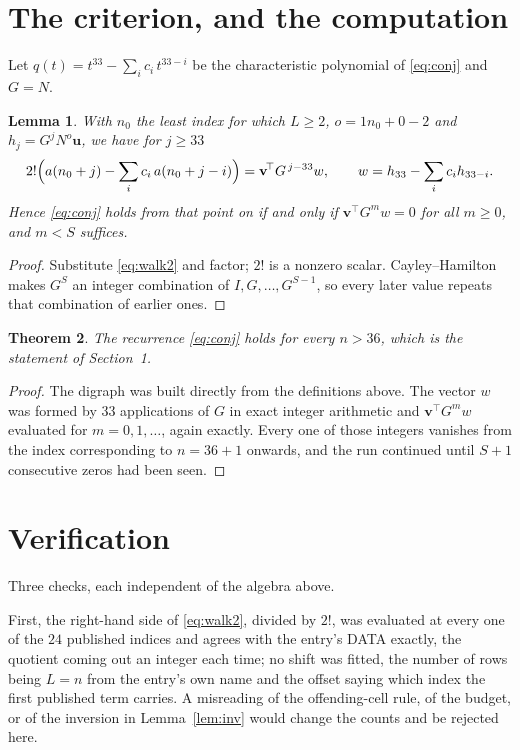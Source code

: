 \documentclass[11pt,a4paper]{article}
\theoremstyle{plain}
\newtheorem{theorem}{Theorem}
\newtheorem{lemma}[theorem]{Lemma}
\theoremstyle{definition}
\begin{document}
\section{The criterion, and the computation}

Let $q(t)=t^{33}-\sum_i c_i\,t^{33-i}$ be the characteristic polynomial of
\eqref{eq:conj} and $G=N$.

\begin{lemma}\label{lem:crit}
With $n_0$ the least index for which $L\ge2$, $o=1n_0+0-2$ and
$h_j=G^{j}N^{o}\mathbf{u}$, we have for $j\ge33$
\[
2!\Bigl(a(n_0+j)-\sum_i c_i\,a(n_0+j-i)\Bigr)=\mathbf{v}^{\!\top}G^{\,j-33}w,
\qquad w=h_{33}-\sum_i c_i h_{33-i} .
\]
Hence \eqref{eq:conj} holds from that point on if and only if
$\mathbf{v}^{\!\top}G^{m}w=0$ for all $m\ge0$, and $m<S$ suffices.
\end{lemma}

\begin{proof}
Substitute \eqref{eq:walk2} and factor; $2!$ is a nonzero scalar. Cayley--Hamilton
makes $G^{S}$ an integer combination of $I,G,\dots,G^{S-1}$, so every later value repeats
that combination of earlier ones.
\end{proof}

\begin{theorem}
The recurrence \eqref{eq:conj} holds for every $n>36$, which is the statement of
Section~1.
\end{theorem}

\begin{proof}
The digraph was built directly from the definitions above. The vector $w$ was formed by
$33$ applications of $G$ in exact integer arithmetic and $\mathbf{v}^{\!\top}G^{m}w$
evaluated for $m=0,1,\dots$, again exactly. Every one of those integers vanishes from the
index corresponding to $n=36+1$ onwards, and the run continued until $S+1$ consecutive
zeros had been seen.
\end{proof}

\section{Verification}

Three checks, each independent of the algebra above.

First, the right-hand side of \eqref{eq:walk2}, divided by $2!$, was evaluated at every
one of the $24$ published indices and agrees with the entry's DATA exactly, the quotient
coming out an integer each time; no shift was fitted, the number of rows being
$L=n$ from the entry's own name and the offset saying which index the first published
term carries. A misreading of the offending-cell rule, of the budget, or of the inversion in
Lemma~\ref{lem:inv} would change the counts and be rejected here.
\end{document}
